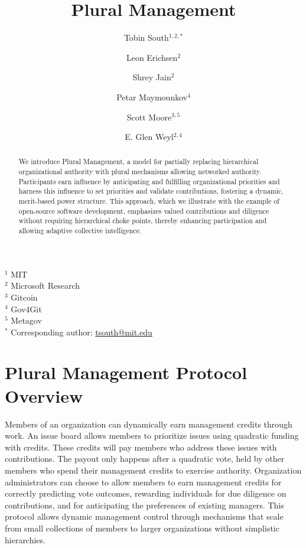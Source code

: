\documentclass{article}
\begin{document}
\title{Plural Management}
\author{
    Tobin South$^{1,2,\ast}$ \and
    Leon Erichsen$^2$ \and
    Shrey Jain$^2$ \and
    Petar Maymounkov$^4$ \and
    Scott Moore$^{3,5}$ \and
    E. Glen Weyl$^{2,4}$
}
\date{}

\maketitle

\begin{flushleft}
\small
$^1$ MIT \\
$^2$ Microsoft Research \\
$^3$ Gitcoin \\
$^4$ Gov4Git \\
$^5$ Metagov \\
$^\ast$ Corresponding author: \href{mailto:tsouth@mit.edu}{tsouth@mit.edu}
\end{flushleft}

\begin{abstract}
We introduce Plural Management, a model for partially replacing hierarchical organizational authority with plural mechanisms allowing networked authority. Participants earn influence by anticipating and fulfilling organizational priorities and harness this influence to set priorities and validate contributions, fostering a dynamic, merit-based power structure. This approach, which we illustrate with the example of open-source software development, emphasizes valued contributions and diligence without requiring hierarchical choke points, thereby enhancing participation and allowing adaptive collective intelligence.
\end{abstract}

\section*{Plural Management Protocol Overview}
Members of an organization can dynamically earn management credits through work. An issue board allows members to prioritize issues using quadratic funding with credits. These credits will pay members who address these issues with contributions. The payout only happens after a quadratic vote, held by other members who spend their management credits to exercise authority. Organization administrators can choose to allow members to earn management credits for correctly predicting vote outcomes, rewarding individuals for due diligence on contributions, and for anticipating the preferences of existing managers. This protocol allows dynamic management control through mechanisms that scale from small collections of members to larger organizations without simplistic hierarchies.
\end{document}
